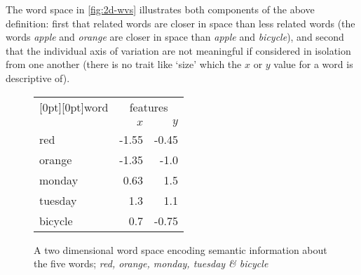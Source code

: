 \documentclass{ucetd}
\begin{document}
\begin{example*}\label{ex:2d-word-space}
  \noindent
  The word space in \autoref{fig:2d-wvs} illustrates both components of the above definition: first that related words are closer in space than less related words (the words \textit{apple} and \textit{orange} are closer in space than \textit{apple} and \textit{bicycle}), and second that the individual axis of variation are not meaningful if considered in isolation from one another (there is no trait like `size'  which the $x$ or $y$ value for a word is descriptive of).
  \begin{figure}[H]
    \centering
    \begin{minipage}[t]{.4\textwidth}
      \centering
      \vspace{0.4em}
      \caption{A two dimensional word space encoding semantic information about the five words; \emph{red, orange, monday, tuesday \& bicycle}}\label{fig:2d-wvs}
    \end{minipage}\hspace{4em}
    \begin{minipage}[t]{.4\textwidth}
      \centering
      \vspace{0.5em}
      \begin{tabular}{l r r}
        \toprule
        \multicolumn{1}{c}{\raisebox{-9pt}[0pt][0pt]{\quad word\quad}} & \multicolumn{2}{c}{features} \\
        \cmidrule(lr){2-3}
        \quad\quad & $x$ & $y$ \\
        \midrule
        red     & -1.55 & -0.45   \\
        orange  & -1.35 & -1.0  \\
        monday  &  0.63 &  1.5   \\
        tuesday &  1.3  &  1.1   \\
        bicycle &  0.7  & -0.75  \\
        \bottomrule
      \end{tabular}
      \vspace{0.42em}
      \label{tab:2d-wvs}
    \end{minipage}
  \end{figure}
  \vspace{0.1em}
\end{example*}
\end{document}
